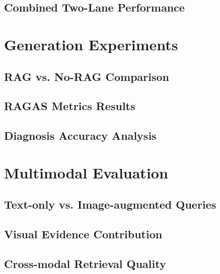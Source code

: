 \subsection{Combined Two-Lane Performance}
\label{subsec:experiments:retrieval:combined}

%
%
\section{Generation Experiments}
\label{sec:experiments:generation}

\subsection{RAG vs. No-RAG Comparison}
\label{subsec:experiments:generation:rag-vs-norag}

\subsection{RAGAS Metrics Results}
\label{subsec:experiments:generation:ragas}

\subsection{Diagnosis Accuracy Analysis}
\label{subsec:experiments:generation:diagnosis}

%
%
\section{Multimodal Evaluation}
\label{sec:experiments:multimodal}

\subsection{Text-only vs. Image-augmented Queries}
\label{subsec:experiments:multimodal:comparison}

\subsection{Visual Evidence Contribution}
\label{subsec:experiments:multimodal:visual}

\subsection{Cross-modal Retrieval Quality}
\label{subsec:experiments:multimodal:crossmodal}

